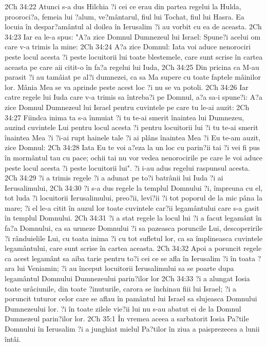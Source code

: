 2Ch 34:22  Atunci s-a dus Hilchia ?i cei ce erau din partea regelui la Hulda, prooroci?a, femeia lui ?alum, ve?mântarul, fiul lui Tochat, fiul lui Hasra. Ea locuia în despar?amântul al doilea în Ierusalim ?i au vorbit cu ea de aceasta.
2Ch 34:23  Iar ea le-a spus: "A?a zice Domnul Dumnezeul lui Israel: Spune?i acelui om care v-a trimis la mine:
2Ch 34:24  A?a zice Domnul: Iata voi aduce nenorociri peste locul acesta ?i peste locuitorii lui toate blestemele, care sunt scrise în cartea aceasta pe care aii citit-o în fa?a regelui lui Iuda,
2Ch 34:25  Din pricina ca M-au parasit ?i au tamâiat pe al?i dumnezei, ca sa Ma supere cu toate faptele mâinilor lor. Mânia Mea se va aprinde peste acest loc ?i nu se va potoli.
2Ch 34:26  Iar catre regele lui Iuda care v-a trimis sa întreba?i pe Domnul, a?a sa-i spune?i: A?a zice Domnul Dumnezeul lui Israel pentru cuvintele pe care tu le-ai auzit:
2Ch 34:27  Fiindca inima ta s-a înmuiat ?i tu te-ai smerit înaintea lui Dumnezeu, auzind cuvintele Lui pentru locul acesta ?i pentru locuitorii lui ?i tu te-ai smerit înaintea Mea ?i ?i-ai rupt hainele tale ?i ai plâns înaintea Mea ?i Eu te-am auzit, zice Domnul:
2Ch 34:28  Iata Eu te voi a?eza la un loc cu parin?ii tai ?i vei fi pus în mormântul tau cu pace; ochii tai nu vor vedea nenorocirile pe care le voi aduce peste locul acesta ?i peste locuitorii lui". ?i i-au adus regelui raspunsul acesta.
2Ch 34:29  ?i a trimis regele ?i a adunat pe to?i batrânii lui Iuda ?i ai Ierusalimului,
2Ch 34:30  ?i s-a dus regele la templul Domnului ?i, împreuna cu el, tot luda ?i locuitorii Ierusalimului, preo?ii, levi?ii ?i tot poporul de la mic pâna la mare; ?i el le-a citit în auzul lor toate cuvintele car?ii legamântului care s-a gasit în templul Domnului.
2Ch 34:31  ?i a stat regele la locul lui ?i a facut legamânt în fa?a Domnului, ca sa urmeze Domnului ?i sa pazeasca poruncile Lui, descoperirile ?i rânduielile Lui, cu toata inima ?i cu tot sufletul lor, ca sa împlineasca cuvintele legamântului, care sunt scrise în cartea aceasta.
2Ch 34:32  Apoi a poruncit regele ca acest legamânt sa aiba tarie pentru to?i cei ce se afla în Ierusalim ?i în toata ?ara lui Veniamin; ?i au început locuitorii Ierusalimului sa se poarte dupa legamântul Domnului Dumnezeului parin?ilor lor
2Ch 34:33  ?i a alungat Iosia toate urâciunile, din toate ?inuturile, carora se închinau fiii lui Israel; ?i a poruncit tuturor celor care se aflau în pamântul lui Israel sa slujeasca Domnului Dumnezeului lor. ?i în toate zilele vie?ii lui nu s-au abatut ei de la Domnul Dumnezeul parin?ilor lor.
2Ch 35:1  În vremea aceea a sarbatorit Iosia Pa?tile Domnului în Ierusalim ?i a junghiat mielul Pa?tilor în ziua a paisprezecea a lunii întâi.

